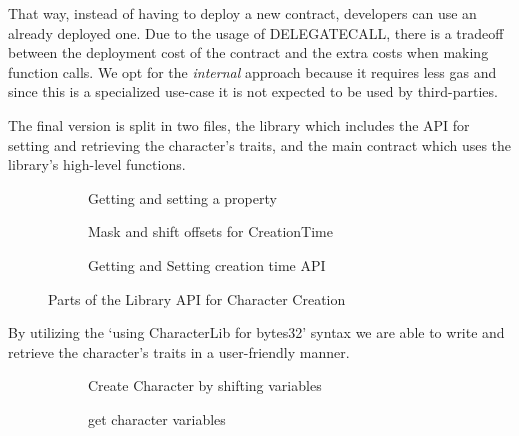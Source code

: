 That way, instead of having to deploy a new contract, developers can use an already deployed one. Due to the usage of DELEGATECALL, there is a tradeoff between the deployment cost of the contract and the extra costs when making function calls. We opt for the \textit{internal} approach because it requires less gas and since this is a specialized use-case it is not expected to be used by third-parties.

The final version is split in two files, the library which includes the API for setting and retrieving the character's traits, and the main contract which uses the library's high-level functions.
\begin{figure}[H]
  \begin{subfigure}[b]{\textwidth}
    \centering
    
    \caption{Getting and setting a property}
  \end{subfigure}
  \begin{subfigure}[b]{\textwidth}
    \centering
    
    \caption{Mask and shift offsets for CreationTime}
  \end{subfigure}
  \begin{subfigure}[b]{\textwidth}
    \centering
    
    \caption{Getting and Setting creation time API}
  \end{subfigure}
  \caption{Parts of the Library API for Character Creation}
\end{figure}

By utilizing the `using CharacterLib for bytes32' syntax we are able to write and retrieve the character's traits in a user-friendly manner.

\begin{figure}[H]
    \begin{subfigure}[b]{0.5\textwidth}
        \centering
        
        \caption{Create Character by shifting variables}
        \label{fig:bytes_encoding_code}
    \end{subfigure}
    \begin{subfigure}[b]{0.5\textwidth}
        \centering
        
        \caption{get character variables}
        \label{fig:bytes_decoding_code}
    \end{subfigure}
    \caption{}
\end{figure}


